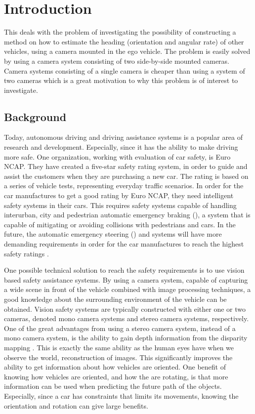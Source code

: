 \chapter{Introduction}
\label{cha:intro}
This \ms deals with the problem of investigating the possibility of constructing a method on how to estimate the heading (orientation and angular rate) of other vehicles, using a camera mounted in the ego vehicle.
The problem is easily solved by using a camera system consisting of two side-by-side mounted cameras.
Camera systems consisting of a single camera is cheaper than using a system of two cameras which is a great motivation to why this problem is of interest to investigate.

\section{Background}
Today, autonomous driving and driving assistance systems is a popular area of research and development.
Especially, since it has the ability to make driving more safe. 
One organization, working with evaluation of car safety, is Euro NCAP.
They have created a five-star safety rating system, in order to guide and assist the customers when they are purchasing a new car.
The rating is based on a series of vehicle tests, representing everyday traffic scenarios. 
In order for the car manufactures to get a good rating by Euro NCAP, they need intelligent safety systems in their cars.
This requires safety systems capable of handling \eg interurban, city and pedestrian automatic emergency braking (\abbrAEB), \ie a system that is capable of mitigating or avoiding collisions with pedestrians and cars.
In the future, the automatic emergency steering (\abbrAES) and \abbrAEB systems will have more demanding requirements in order for the car manufactures to reach the highest safety ratings \cite{EuroNCAP:2017}.

One possible technical solution to reach the safety requirements is to use vision based safety assistance systems.
By using a camera system, capable of capturing a wide scene in front of the vehicle combined with image processing techniques, a good knowledge about the surrounding environment of the vehicle can be obtained.
Vision safety systems are typically constructed with either one or two cameras, denoted mono camera systems and stereo camera systems, respectively.
One of the great advantages from using a stereo camera system, instead of a mono camera system, is the ability to gain depth information from the disparity mapping \citep{Sivaraman:2013}.
This is exactly the same ability as the human eyes have when we observe the world, \ie reconstruction of  images.
This significantly improves the ability to get information about how vehicles are \eg oriented.
One benefit of knowing how vehicles are oriented, and how the are rotating, is that more information can be used when predicting the future path of the objects.
Especially, since \eg a car has constraints that limits its movements, knowing the orientation and rotation can give large benefits.

